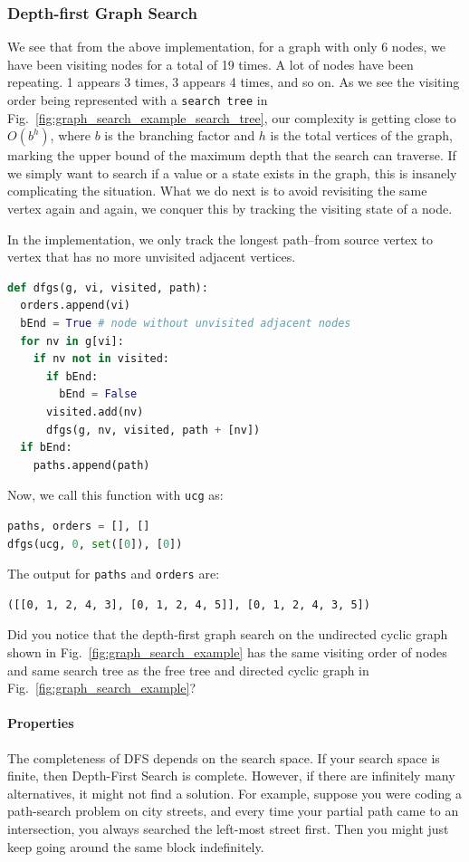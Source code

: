 \documentclass[main.tex]{subfiles}
\begin{document}
\subsubsection{Depth-first Graph Search}
 We see that from the above implementation, for a graph with only 6 nodes, we have been visiting nodes for a total of 19 times. A lot of nodes have been repeating. 1 appears 3 times, 3 appears 4 times, and so on. As we see the visiting order being represented with a \texttt{search tree} in Fig.~\ref{fig:graph_search_example_search_tree}, our complexity is getting close to $O(b^h)$, where $b$ is the branching factor and $h$ is the total vertices of the graph, marking the upper bound of the maximum depth that the search can traverse. If we simply want to search if a value or a state exists in the graph, this is insanely complicating the situation. What we do next is to avoid revisiting the same vertex again and again, we conquer this by tracking the visiting state of a node. 
 
 In the implementation, we only track the longest path--from source vertex to vertex that has no more unvisited adjacent vertices. 
\begin{lstlisting}[language=Python]
def dfgs(g, vi, visited, path):
  orders.append(vi)
  bEnd = True # node without unvisited adjacent nodes    
  for nv in g[vi]:  
    if nv not in visited: 
      if bEnd:
        bEnd = False
      visited.add(nv)
      dfgs(g, nv, visited, path + [nv])
  if bEnd:
    paths.append(path)
\end{lstlisting}
Now, we call this function with \texttt{ucg} as:
\begin{lstlisting}[language=Python]
paths, orders = [], []
dfgs(ucg, 0, set([0]), [0])
\end{lstlisting}
The output for \texttt{paths} and \texttt{orders} are:
\begin{lstlisting}[numbers=none]
([[0, 1, 2, 4, 3], [0, 1, 2, 4, 5]], [0, 1, 2, 4, 3, 5])
\end{lstlisting}
Did you notice that the depth-first graph search on the undirected cyclic graph shown in Fig.~\ref{fig:graph_search_example} has the same visiting order of nodes and same search tree as the free tree and directed cyclic graph in Fig.~\ref{fig:graph_search_example}?


\paragraph{Properties} The completeness of DFS depends on  the search space. If your search space is finite, then Depth-First Search is complete. However, if there are infinitely many alternatives, it might not find a solution. For example, suppose you were coding a path-search problem on city streets, and every time your partial path came to an intersection, you always searched the left-most street first. Then you might just keep going around the same block indefinitely.
\end{document}
